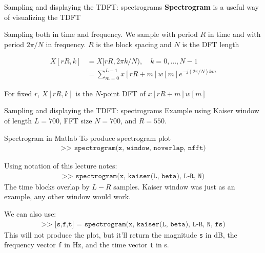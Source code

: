 \documentclass[10pt, aspectratio=169, handout]{beamer}
\begin{document}
%
\begin{frame}{Sampling and displaying the TDFT: spectrograms}
	\textbf{Spectrogram} is a useful way of visualizing the TDFT
	
	Sampling both in time and frequency.
	We sample with period $R$ in time and with period $2\pi/N$ in frequency. $R$ is the block spacing and $N$ is the DFT length
	
	\begin{align}
		X[rR, k] &= X[rR, 2\pi k/N), \quad k = 0, \ldots, N-1 \tag{sample in time and frequency} \\
		&= \sum_{m = 0}^{L-1}x[rR+m]w[m]e^{-j(2\pi/N)km} \tag{finite-length window}
	\end{align}
			
	For fixed $r$, $X[rR, k]$ is the $N$-point DFT of $x[rR+m]w[m]$
	
\end{frame}

%
\begin{frame}{Sampling and displaying the TDFT: spectrograms}
Example using Kaiser window of length $L = 700$, FFT size $N = 700$, and $R = 550$.
\begin{center}
	\resizebox{0.7\textwidth}{!}{}
\end{center}
\end{frame}

\begin{frame}{Spectrogram in Matlab}
	To produce spectrogram plot
	\begin{align*}
		\texttt{>> spectrogram(x, window, noverlap, nfft)} \tag{Matlab notation}
	\end{align*}
	
	Using notation of this lecture notes:
	\begin{align*}
	\texttt{>> spectrogram(x, kaiser(L, beta), L-R, N)} \tag{this lecture's notation}
	\end{align*}
	The time blocks overlap by $L-R$ samples. Kaiser window was just as an example, any other window would work.
	
	\vspace{0.25cm}
	
	We can also use:
	\begin{align*}
		\texttt{>> [s,f,t] = spectrogram(x, kaiser(L, beta), L-R, N, fs)}
	\end{align*}
	This will not produce the plot, but it'll return the magnitude \texttt{s} in dB, the frequency vector \texttt{f} in Hz, and the time vector \texttt{t} in s.
\end{frame}
\end{document}
